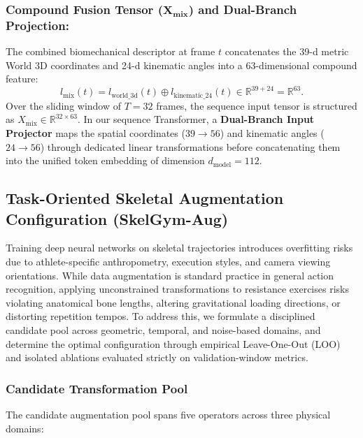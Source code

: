 \documentclass[preprint,12pt]{elsarticle}
\begin{document}
\subsubsection{Compound Fusion Tensor ($\mathbf{X_{\text{mix}}}$) and Dual-Branch Projection:}
The combined biomechanical descriptor at frame $t$ concatenates the 39-d metric World 3D coordinates and 24-d kinematic angles into a 63-dimensional compound feature:
\begin{equation}
    l_{\text{mix}}(t) = l_{\text{world\_3d}}(t) \oplus l_{\text{kinematic\_24}}(t) \in \mathbb{R}^{39 + 24} = \mathbb{R}^{63}.
\end{equation}
Over the sliding window of $T = 32$ frames, the sequence input tensor is structured as $X_{\text{mix}} \in \mathbb{R}^{32 \times 63}$. In our sequence Transformer, a \textbf{Dual-Branch Input Projector} maps the spatial coordinates ($39 \to 56$) and kinematic angles ($24 \to 56$) through dedicated linear transformations before concatenating them into the unified token embedding of dimension $d_{\text{model}} = 112$.

\subsection{Task-Oriented Skeletal Augmentation Configuration (SkelGym-Aug)}
Training deep neural networks on skeletal trajectories introduces overfitting risks due to athlete-specific anthropometry, execution styles, and camera viewing orientations. While data augmentation is standard practice in general action recognition, applying unconstrained transformations to resistance exercises risks violating anatomical bone lengths, altering gravitational loading directions, or distorting repetition tempos. To address this, we formulate a disciplined candidate pool across geometric, temporal, and noise-based domains, and determine the optimal configuration through empirical Leave-One-Out (LOO) and isolated ablations evaluated strictly on validation-window metrics.

\subsubsection{Candidate Transformation Pool}
The candidate augmentation pool spans five operators across three physical domains:
\end{document}
